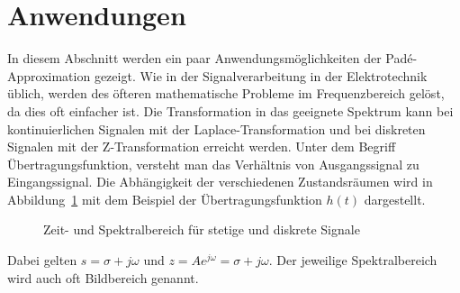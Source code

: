 %
%
%
\section{Anwendungen
\label{pade:section:Anwendungen}}

In diesem Abschnitt werden ein paar Anwendungsmöglichkeiten der Padé-Approximation gezeigt.
Wie in der Signalverarbeitung in der Elektrotechnik üblich, werden des öfteren mathematische Probleme im Frequenzbereich gelöst, da dies oft einfacher ist. 
%
%
%
Die Transformation in das geeignete Spektrum kann bei kontinuierlichen Signalen mit der Laplace-Transformation und bei diskreten Signalen mit der Z-Transformation erreicht werden.
Unter dem Begriff Übertragungsfunktion, versteht man das Verhältnis von Ausgangssignal zu Eingangssignal.
Die Abhängigkeit der verschiedenen Zustandsräumen wird
in Abbildung~\ref{pade:zeitundspektral}
mit dem Beispiel der Übertragungsfunktion $h(t)$ dargestellt.
\begin{figure}
\centering
	\tikzset{>=latex}
\caption{Zeit- und Spektralbereich für stetige und diskrete Signale
\label{pade:zeitundspektral}}
\end{figure}
Dabei gelten $s= \sigma+ j\omega$ und $z = A e^{j\omega} =\sigma+ j\omega$.
Der jeweilige Spektralbereich wird auch oft Bildbereich genannt.

